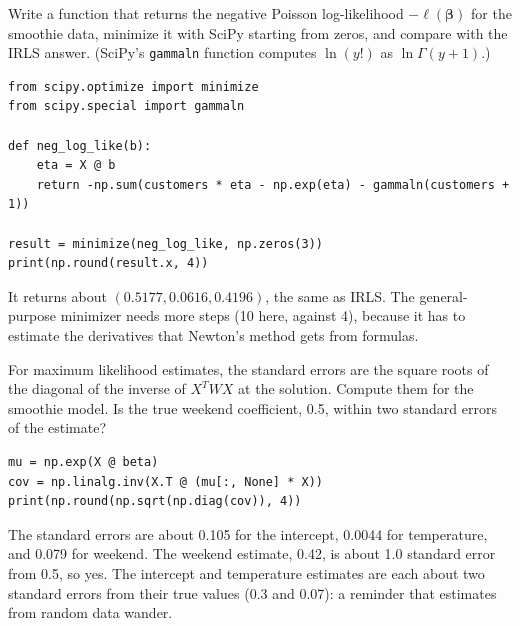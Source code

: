 \begin{Exercise}[label=glm4, title={Check with SciPy}]
Write a function that returns the negative Poisson log-likelihood $-\ell(\boldsymbol{\beta})$ for the smoothie
data, minimize it with SciPy starting from zeros, and compare with the IRLS answer. (SciPy's \verb|gammaln|
function computes $\ln(y!)$ as $\ln \Gamma(y + 1)$.)
\end{Exercise}
\begin{Answer}[ref=glm4]
\begin{verbatim}
from scipy.optimize import minimize
from scipy.special import gammaln

def neg_log_like(b):
    eta = X @ b
    return -np.sum(customers * eta - np.exp(eta) - gammaln(customers + 1))

result = minimize(neg_log_like, np.zeros(3))
print(np.round(result.x, 4))
\end{verbatim}
It returns about $(0.5177, 0.0616, 0.4196)$, the same as IRLS. The general-purpose minimizer needs more steps (10
here, against 4), because it has to estimate the derivatives that Newton's method gets from formulas.
\end{Answer}

\begin{Exercise}[label=glm5, title={How sure are we?}]
For maximum likelihood estimates, the standard errors are the square roots of the diagonal of the inverse of
$X^T W X$ at the solution. Compute them for the smoothie model. Is the true weekend coefficient, 0.5, within two
standard errors of the estimate?
\end{Exercise}
\begin{Answer}[ref=glm5]
\begin{verbatim}
mu = np.exp(X @ beta)
cov = np.linalg.inv(X.T @ (mu[:, None] * X))
print(np.round(np.sqrt(np.diag(cov)), 4))
\end{verbatim}
The standard errors are about 0.105 for the intercept, 0.0044 for temperature, and 0.079 for weekend. The weekend
estimate, 0.42, is about 1.0 standard error from 0.5, so yes. The intercept and temperature estimates are each about
two standard errors from their true values (0.3 and 0.07): a reminder that estimates from random data wander.
\end{Answer}
